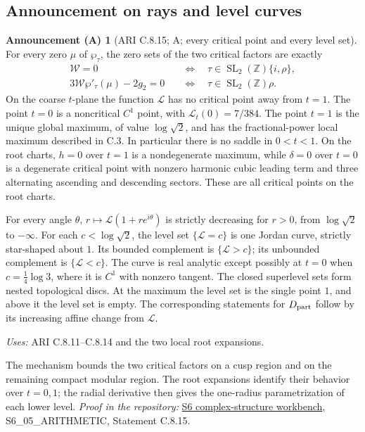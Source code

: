 \documentclass[11pt,a4paper]{article}
\theoremstyle{plain}
\theoremstyle{definition}
\newtheorem{announcement}[theorem]{Announcement (A)}
\newcommand{\Z}{\mathbb Z}
\begin{document}
\subsection{Announcement on rays and level curves}

\begin{announcement}[ARI C.8.15; A; every critical point and every level set]\label{ari:C.8.15}
For every zero $\mu$ of $\wp_\tau$, the zero sets of the two
critical factors are exactly
\[
 \begin{aligned}
 \mathcal W=0&\quad\Longleftrightarrow\quad
       \tau\in\operatorname{SL}_2(\Z)\{i,\rho\},\\
 3\mathcal W\wp'_\tau(\mu)-2g_2=0&\quad\Longleftrightarrow\quad
       \tau\in\operatorname{SL}_2(\Z)\rho.
 \end{aligned}
\]
On the coarse $t$-plane the function $\mathcal L$ has no critical point
away from $t=1$. The point $t=0$ is a noncritical $C^1$ point,
with $\mathcal L_t(0)=7/384$. The point $t=1$ is the unique global
maximum, of value $\log\sqrt2$, and has the fractional-power
local maximum described in C.3. In particular there is no
saddle in $0<t<1$. On the root charts, $h=0$ over $t=1$
is a nondegenerate maximum, while $\delta=0$ over $t=0$
is a degenerate critical point with nonzero harmonic cubic
leading term and three alternating ascending and descending
sectors. These are all critical points on the root charts.

For every angle $\theta$, $r\mapsto \mathcal L(1+re^{i\theta})$ is
strictly decreasing for $r>0$, from $\log\sqrt2$ to $-\infty$.
For each $c<\log\sqrt2$, the level set $\{\mathcal L=c\}$ is one
Jordan curve, strictly star-shaped about $1$. Its bounded
complement is $\{\mathcal L>c\}$; its unbounded complement is
$\{\mathcal L<c\}$. The curve is real analytic except possibly at
$t=0$ when $c=\frac14\log3$, where it is $C^1$ with nonzero
tangent. The closed superlevel sets form nested topological
discs. At the maximum the level set is the single point $1$,
and above it the level set is empty. The corresponding
statements for $D_{\rm part}$ follow by its increasing affine
change from $\mathcal L$.
\end{announcement}
\noindent\textit{Uses:} ARI C.8.11--C.8.14 and the two local root expansions.\par
The mechanism bounds the two critical factors on a cusp region and on the remaining compact modular region. The root expansions identify their behavior over $t=0,1$; the radial derivative then gives the one-radius parametrization of each lower level.
\noindent\textit{Proof in the repository:} \href{https://github.com/KokunoYumeto/s6-complex-structure-workbench}{S6 complex-structure workbench}, S6\_05\_ARITHMETIC, Statement C.8.15.
\end{document}
